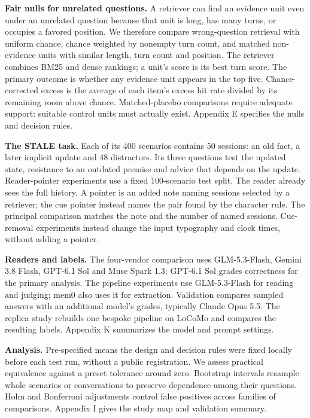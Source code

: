 \documentclass[11pt]{article}
\begin{document}
\textbf{Fair nulls for unrelated questions.} A retriever can find an evidence unit even under an unrelated question because that unit is long, has many turns, or occupies a favored position. We therefore compare wrong-question retrieval with uniform chance, chance weighted by nonempty turn count, and matched non-evidence units with similar length, turn count and position. The retriever combines BM25 and dense rankings; a unit's score is its best turn score. The primary outcome is whether any evidence unit appears in the top five. Chance-corrected excess is the average of each item's excess hit rate divided by its remaining room above chance. Matched-placebo comparisons require adequate support: suitable control units must actually exist. Appendix E specifies the nulls and decision rules.

\textbf{The STALE task.} Each of its 400 scenarios contains 50 sessions: an old fact, a later implicit update and 48 distractors. Its three questions test the updated state, resistance to an outdated premise and advice that depends on the update. Reader-pointer experiments use a fixed 100-scenario test split. The reader already sees the full history. A pointer is an added note naming sessions selected by a retriever; the cue pointer instead names the pair found by the character rule. The principal comparison matches the note and the number of named sessions. Cue-removal experiments instead change the input typography and clock times, without adding a pointer.

\textbf{Readers and labels.} The four-vendor comparison uses GLM-5.3-Flash, Gemini 3.8 Flash, GPT-6.1 Sol and Muse Spark 1.3; GPT-6.1 Sol grades correctness for the primary analysis. The pipeline experiments use GLM-5.3-Flash for reading and judging; mem0 also uses it for extraction. Validation compares sampled answers with an additional model's grades, typically Claude Opus 5.5. The replica study rebuilds one bespoke pipeline on LoCoMo and compares the resulting labels. Appendix K summarizes the model and prompt settings.

\textbf{Analysis.} Pre-specified means the design and decision rules were fixed locally before each test run, without a public registration. We assess practical equivalence against a preset tolerance around zero. Bootstrap intervals resample whole scenarios or conversations to preserve dependence among their questions. Holm and Bonferroni adjustments control false positives across families of comparisons. Appendix I gives the study map and validation summary.
\end{document}

